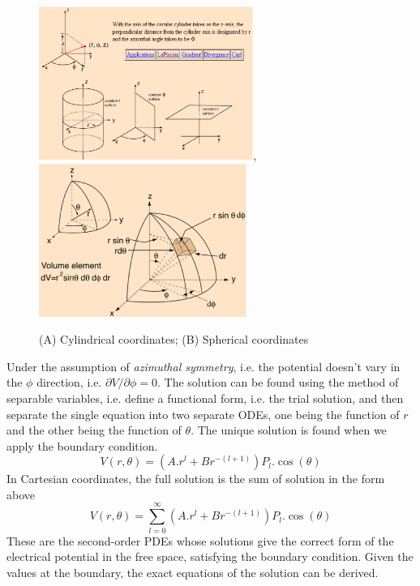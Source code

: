 \begin{figure}[hbt]
  \centerline{\includegraphics[height=5cm,
    angle=0]{./images/cylindrical_coordinate.eps}, \includegraphics[height=5cm,
    angle=0]{./images/spherical_coordinate.eps}}
  \caption{(A) Cylindrical coordinates; (B) Spherical coordinates}
  \label{fig:coordinates}
\end{figure}


Under the assumption of {\it azimuthal symmetry}, i.e. the potential doesn't
vary in the $\phi	$ direction, i.e. $\partial V/\partial\phi = 0$. The
solution can be found using the method of separable variables, i.e. define a
functional form, i.e. the trial solution, and then separate the single equation
into two separate ODEs, one being the function of $r$ and the other being the
function of $\theta$. The unique solution is found when we apply the boundary
condition. 
\begin{equation}
V(r,\theta) = (A.r^l + Br^{-(l+1)})P_l.\cos(\theta)
\end{equation}
In Cartesian coordinates, the full solution is the sum of solution in the form
above
\begin{equation}
V(r,\theta) = \sum_{l=0}^\infty (A.r^l + Br^{-(l+1)})P_l.\cos(\theta)
\end{equation}
These are the second-order PDEs whose solutions give the correct form of the
electrical potential in the free space, satisfying the boundary condition. Given
the values at the boundary, the exact equations of the solution can be derived.

